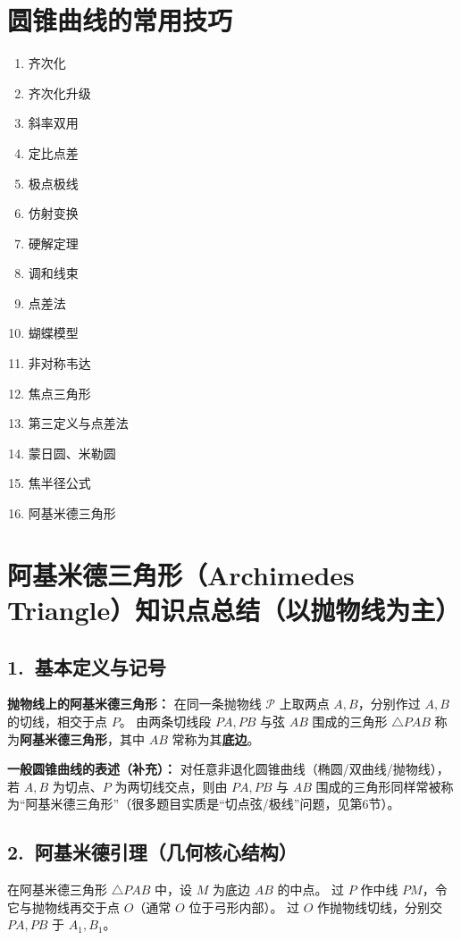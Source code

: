\documentclass[UTF8]{ctexart}
\begin{document}
	\section{圆锥曲线的常用技巧}
	\begin{enumerate}
		\item 齐次化
		\item 齐次化升级
		\item 斜率双用
		\item 定比点差
		\item 极点极线
		\item 仿射变换
		\item 硬解定理
		\item 调和线束
		\item 点差法
		\item 蝴蝶模型
		\item 非对称韦达
		\item 焦点三角形
		\item 第三定义与点差法
		\item 蒙日圆、米勒圆
		\item 焦半径公式
		\item 阿基米德三角形
		
	\end{enumerate}


	\section*{阿基米德三角形（Archimedes Triangle）知识点总结（以抛物线为主）}
	
	\subsection*{1.\ 基本定义与记号}
	\textbf{抛物线上的阿基米德三角形：}
	在同一条抛物线 $\mathcal P$ 上取两点 $A,B$，分别作过 $A,B$ 的切线，相交于点 $P$。
	由两条切线段 $PA,PB$ 与弦 $AB$ 围成的三角形 $\triangle PAB$ 称为\textbf{阿基米德三角形}，其中 $AB$ 常称为其\textbf{底边}。
	
	\textbf{一般圆锥曲线的表述（补充）：}
	对任意非退化圆锥曲线（椭圆/双曲线/抛物线），若 $A,B$ 为切点、$P$ 为两切线交点，则由 $PA,PB$ 与 $AB$ 围成的三角形同样常被称为“阿基米德三角形”（很多题目实质是“切点弦/极线”问题，见第6节）。
	
	\subsection*{2.\ 阿基米德引理（几何核心结构）}
	在阿基米德三角形 $\triangle PAB$ 中，设 $M$ 为底边 $AB$ 的中点。
	过 $P$ 作中线 $PM$，令它与抛物线再交于点 $O$（通常 $O$ 位于弓形内部）。
	过 $O$ 作抛物线切线，分别交 $PA,PB$ 于 $A_1,B_1$。
	
\end{document}
